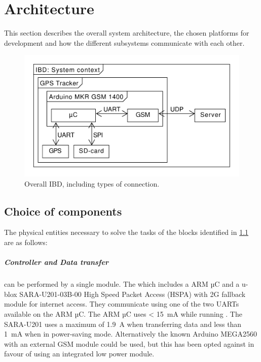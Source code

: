 
\chapter{Architecture}
\label{sec:Architecture}
This section describes the overall system architecture, the chosen platforms for development and how the different subsystems communicate with each other.

\begin{figure}[H]
	\centering
	\includegraphics[width=0.7\linewidth]{gfx/Design/Overall_IBD.pdf}
	\caption{Overall IBD, including types of connection.}
	\label{fig:IBD:overall}
\end{figure}

\section{Choice of components}
The physical entities necessary to solve the tasks of the blocks identified in \cref{fig:IBD:overall} are as follows:

\paragraph{Controller and Data transfer} can be performed by a single module. The \MKR which includes a \SAMD ARM µC and a u-blox SARA-U201-03B-00 High Speed Packet Access (HSPA) with 2G fallback module for internet access\cite{MKRGSM1400}.
They communicate using one of the two UARTs available on the \SAMD ARM µC.
The \SAMD ARM µC uses \SI{< 15}{\milli\ampere} while running \cite[p.~791-794]{SAMD21}.
The SARA-U201 uses a maximum of \SI{1.9}{\ampere} when transferring data \cite[p.~26]{SARAU201} and less than \SI{1}{\milli\ampere} when in power-saving mode. Alternatively the known Arduino MEGA2560 with an external GSM module could be used, but this has been opted against in favour of using an integrated low power module.

